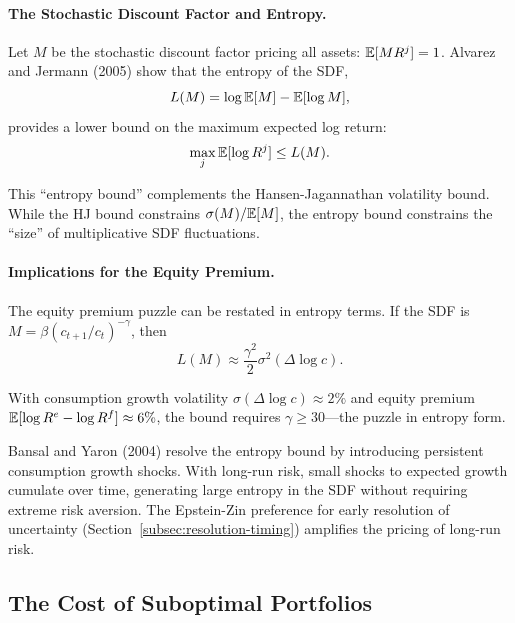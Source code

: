 \paragraph{The Stochastic Discount Factor and Entropy.}

Let $M$ be the stochastic discount factor pricing all assets: $\mathbb{E}[MR^j] = 1$. Alvarez and Jermann (2005) show that the entropy of the SDF,
\begin{equation}
L(M) = \log \mathbb{E}[M] - \mathbb{E}[\log M],
\label{eq:sdf-entropy}
\end{equation}
provides a lower bound on the maximum expected log return:
\begin{equation}
\max_j \mathbb{E}[\log R^j] \leq L(M).
\label{eq:alvarez-jermann}
\end{equation}

This ``entropy bound'' complements the Hansen-Jagannathan volatility bound. While the HJ bound constrains $\sigma(M)/\mathbb{E}[M]$, the entropy bound constrains the ``size'' of multiplicative SDF fluctuations.

\paragraph{Implications for the Equity Premium.}

The equity premium puzzle can be restated in entropy terms. If the SDF is $M = \beta(c_{t+1}/c_t)^{-\gamma}$, then
\begin{equation}
L(M) \approx \frac{\gamma^2}{2} \sigma^2(\Delta \log c).
\label{eq:sdf-entropy-crra}
\end{equation}

With consumption growth volatility $\sigma(\Delta \log c) \approx 2\%$ and equity premium $\mathbb{E}[\log R^e - \log R^f] \approx 6\%$, the bound requires $\gamma \geq 30$---the puzzle in entropy form.

\begin{calloutnote}
Bansal and Yaron (2004) resolve the entropy bound by introducing persistent consumption growth shocks. With long-run risk, small shocks to expected growth cumulate over time, generating large entropy in the SDF without requiring extreme risk aversion. The Epstein-Zin preference for early resolution of uncertainty (Section~\ref{subsec:resolution-timing}) amplifies the pricing of long-run risk.
\end{calloutnote}

\subsection{The Cost of Suboptimal Portfolios}
\label{subsec:cost-suboptimal}

